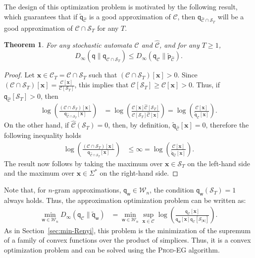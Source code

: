 \documentclass{article}
\newcommand{\sC}{\mathscr C}
\newcommand{\sS}{\mathscr S}
\newcommand{\bx}{{\mathbf x}}
\newcommand{\sfp}{{\mathsf p}}
\newcommand{\sfq}{{\mathsf q}}
\newcommand{\sfw}{{\mathsf w}}
\newcommand{\cW}{\mathcal W}
\newtheorem{theorem}{Theorem}
\begin{document}
The design of this optimization problem is motivated by the following result,
which guarantees that if $\tilde{\sfq}_{\widehat{\sC}}$ is a good approximation of $\sC$,
then $\sfq_{\widehat{\sC} \cap \sS_T}$ will be a good approximation
of $\sC \cap \sS_T$ for any $T$.

\begin{theorem}
  For any stochastic automata $\sC$ and $\widehat{\sC}$, and for any $T \geq 1$, 
  $$D_\infty(\sfq \| \sfq_{\widehat{\sC} \cap \sS_T}) \leq D_\infty(\sfq_\sC \| \tilde{\sfp}_{\widehat{\sC}}).$$ 
\end{theorem}
\begin{proof}
  Let $\bx \in \sC_T = \sC \cap \sS_T$ such that $(\sC \cap \sS_T)[\bx] > 0$.
  Since $(\sC \cap \sS_T)[\bx] = \frac{\sC[\bx]}{\sC[\sS_T]}$, this implies that 
  $\sC[\sS_T] \geq \sC[\bx] > 0$. Thus, if $\sfq_{\widehat{\sC}}[\sS_T] > 0$, then 
  \begin{align*}
    \log\left(\frac{(\sC \cap \sS_T)[\bx]}{ \sfq_{\widehat{\sC} \cap \sS_T}[\bx] }\right)
    & = \log\left(\frac{\sC[\bx] \widehat{\sC}[\sS_T]}{ \sC[\sS_T] \widehat{\sC}[\bx]} \right)
    =  \log\left(\frac{\sC[\bx] }{ \tilde{\sfq}_{\widehat{\sC}}[\bx]} \right).
  \end{align*}
  On the other hand, if $\widehat{\sC}(\sS_T) = 0$, then, by definition,
  $\tilde{\sfq}_{\widehat{\sC}}[\bx] = 0$, therefore the following inequality holds 
  \begin{align*}
    \log\left(\frac{(\sC \cap \sS_T)[\bx]}{ \sfq_{\widehat{\sC}\cap \sS_T}[\bx] }\right)
    &\leq \infty
    = \log\left(\frac{\sC[\bx] }{ \tilde{\sfq}_{\widehat{\sC}}[\bx]} \right).
  \end{align*}
  The result now follows by taking the maximum over $\bx \in \sS_T$ on the left-hand side
  and the maximum over $\bx \in \Sigma^*$ on the right-hand side.
\end{proof}

Note that, for $n$-gram approximations, $\sfq_{\sfw} \in \cW_n$, the condition
$\sfq_{\sfw}(\sS_T) = 1$ always holds. Thus, the approximation optimization problem
can be written as: 
\begin{align*}
  \min_{\sfw \in \cW_n} D_\infty(\sfq_\sC \| \tilde{\sfq}_{\sfw})
  & = \min_{\sfw \in \cW_n} \sup_{\bx \in \sC} \log\left( \frac{\sfq_\sC[\bx]}{\sfq_{\sfw}[\bx]\sfq_\sC[\sS_{|\bx|}]}\right). 
\end{align*}
As in Section~\ref{sec:min-Renyi}, this problem is the minimization of the 
supremum of a family of convex functions over the product of simplices. Thus, 
it is a 
convex optimization problem and can be solved using the \textsc{Prod-EG} algorithm. 
\end{document}

